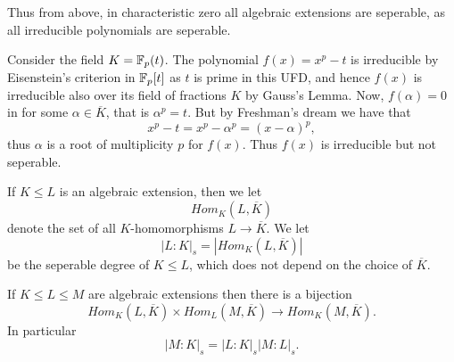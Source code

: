 \documentclass[twoside, a4paper, 10pt]{amsart}
\begin{document}
Thus from above, in characteristic zero all algebraic extensions are seperable, as all irreducible polynomials are seperable.

\begin{eg} Consider the field $K = \mathbb{F}_p(t)$. The polynomial $f(x) = x^p - t$ is irreducible by Eisenstein's criterion in $\mathbb{F}_p[t]$ as $t$ is prime in this UFD, and hence $f(x)$ is irreducible also over its field of fractions $K$ by Gauss's Lemma. Now, $f(\alpha) = 0$ in for some $\alpha \in \overline{K}$, that is $\alpha^p = t$. But by Freshman's dream we have that $$x^p - t = x^p - \alpha^p = (x-\alpha)^p,$$ thus $\alpha$ is a root of multiplicity $p$ for $f(x)$. Thus $f(x)$ is irreducible but not seperable. \end{eg}

\begin{mydef} If $K \leq L$ is an algebraic extension, then we let $$Hom_K(L, \overline{K})$$ denote the set of all $K$-homomorphisms $L \to \overline{K}$. We let $$|L:K|_s = |Hom_K(L, \overline{K})|$$ be the seperable degree of $K \leq L$, which does not depend on the choice of $\overline{K}$.

\end{mydef}

\begin{prop} \label{prop: Hom tower bijections} If $K \leq L \leq M$ are algebraic extensions then there is a bijection $$Hom_K(L, \overline{K}) \times Hom_L(M, \overline{K}) \to Hom_K(M, \overline{K}).$$ In particular $$|M:K|_s = |L:K|_s |M:L|_s.$$

\end{prop}
\end{document}
